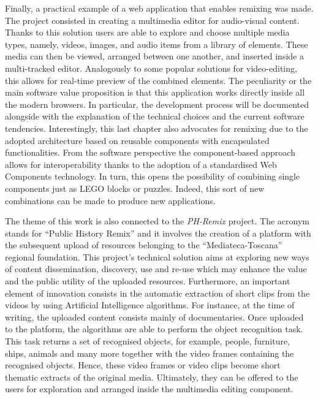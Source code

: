 Finally, a practical example of a web application that enables remixing was made. The project consisted in creating a multimedia editor for audio-visual content. Thanks to this solution users are able to explore and choose multiple media types, namely, videos, images, and audio items from a library of elements. These media can then be viewed, arranged between one another, and inserted inside a multi-tracked editor. Analogously to some popular solutions for video-editing, this allows for real-time preview of the combined elements. The peculiarity or the main software value proposition is that this application works directly inside all the modern browsers.
In particular, the development process will be documented alongside with the explanation of the technical choices and the current software tendencies. Interestingly, this last chapter also advocates for remixing due to the adopted architecture based on reusable components with encapsulated functionalities. From the software perspective the component-based approach allows for interoperability thanks to the adoption of a standardised Web Components technology. In turn, this opens the possibility of combining single components just as LEGO blocks or puzzles. Indeed, this sort of new combinations can be made to produce new applications.

The theme of this work is also connected to the \emph{PH-Remix} project. The acronym stands for “Public History Remix” and it involves the creation of a platform with the subsequent upload of resources belonging to the “Mediateca-Toscana” regional foundation. This project’s technical solution aims at exploring new ways of content dissemination, discovery, use and re-use which may enhance the value and the public utility of the uploaded resources. Furthermore, an important element of innovation consists in the automatic extraction of short clips from the videos by using Artificial Intelligence algorithms. For instance, at the time of writing, the uploaded content consists mainly of documentaries. Once uploaded to the platform, the algorithms are able to perform the object recognition task. This task returns a set of recognised objects, for example, people, furniture, ships, animals and many more together with the video frames containing the recognised objects. Hence, these video frames or video clips become short thematic extracts of the original media. Ultimately, they can be offered to the users for exploration and arranged inside the multimedia editing component.

